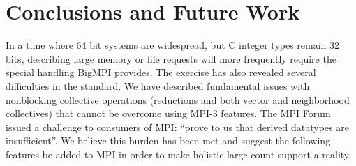 
\section{Conclusions and Future Work}

In a time where 64 bit systems are widespread,
but C integer types remain 32 bits, describing large memory or file requests
will more frequently require the special handling BigMPI provides.  The
exercise has also revealed several difficulties in the standard.
We have described fundamental issues with nonblocking
collective operations (reductions and both vector and neighborhood collectives)
that cannot be overcome using MPI-3 features.
The MPI Forum issued a challenge to consumers of MPI:
``prove to us that derived datatypes are insufficient''.
We believe this burden has been met and suggest the following features
be added to MPI in order to make holistic large-count support a reality.

